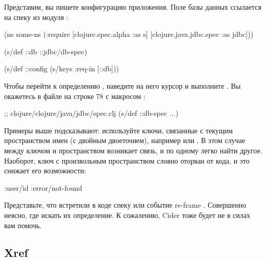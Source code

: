 Представим, вы пишете конфигурацию приложения. Поле  базы данных ссылается на спеку из модуля :

\begin{english}
  \begin{clojure}
(ns some-ns
  (:require
   [clojure.spec.alpha :as s]
   [clojure.java.jdbc.spec :as jdbc]))

(s/def ::db ::jdbc/db-spec)

(s/def ::config
  (s/keys :req-in [::db]))
  \end{clojure}
\end{english}

Чтобы перейти к определению , наведите на него курсор и выполните . Вы окажетесь в файле  на строке 78 с макросом :

\begin{english}
  \begin{clojure}
;; clojure/clojure/java/jdbc/spec.clj
(s/def ::db-spec ...)
  \end{clojure}
\end{english}

Примеры выше подсказывают: используйте ключи, связанные с текущим пространством имен (с двойным двоеточием), например  или . В этом случае между ключом и пространством возникает связь, и по одному легко найти другое. Наоборот, ключ с произвольным пространством словно оторван от кода, и это снижает его возможности:

\begin{english}
  \begin{clojure}
:user/id
:error/not-found
  \end{clojure}
\end{english}

Представьте, что встретили в коде спеку  или событие re-frame . Совершенно неясно, где искать их определение. К сожалению, Cider тоже будет не в силах вам помочь.

\subsection{Xref}

\label{section-xref}

\def\urlfastautocomp{https://pypi.org/project/fast-autocomplete/}

\def\urlctags{https://en.wikipedia.org/wiki/Ctags}

